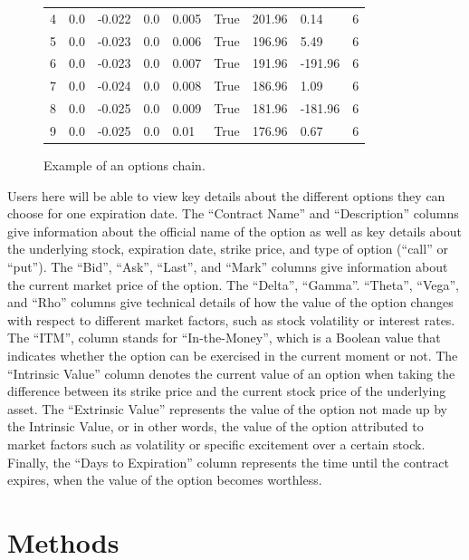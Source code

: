 \documentclass{article}
\begin{document}
\begin{figure}[h]
{\begin{tabular}{lllllllll}
    4 & 0.0   & -0.022 & 0.0  & 0.005 & True & 201.96          & 0.14            & 6                  \\
    5 & 0.0   & -0.023 & 0.0  & 0.006 & True & 196.96          & 5.49            & 6                  \\
    6 & 0.0   & -0.023 & 0.0  & 0.007 & True & 191.96          & -191.96         & 6                  \\
    7 & 0.0   & -0.024 & 0.0  & 0.008 & True & 186.96          & 1.09            & 6                  \\
    8 & 0.0   & -0.025 & 0.0  & 0.009 & True & 181.96          & -181.96         & 6                  \\
    9 & 0.0   & -0.025 & 0.0  & 0.01  & True & 176.96          & 0.67            & 6                 
    \end{tabular}%
    }
    \caption{Example of an options chain.}
    \label{fig:Figure 5}
\end{figure}

Users here will be able to view key details about the different options they can choose for one expiration date. The \enquote{Contract Name} and \enquote{Description} columns give information about the official name of the option as well as key details about the underlying stock, expiration date, strike price, and type of option (\enquote{call} or \enquote{put}). The \enquote{Bid}, \enquote{Ask}, \enquote{Last}, and \enquote{Mark} columns give information about the current market price of the option. The \enquote{Delta}, \enquote{Gamma}. \enquote{Theta}, \enquote{Vega}, and \enquote{Rho} columns give technical details of how the value of the option changes with respect to different market factors, such as stock volatility or interest rates. The \enquote{ITM}, column stands for \enquote{In-the-Money}, which is a Boolean value that indicates whether the option can be exercised in the current moment or not. The \enquote{Intrinsic Value} column denotes the current value of an option when taking the difference between its strike price and the current stock price of the underlying asset. The \enquote{Extrinsic Value} represents the value of the option not made up by the Intrinsic Value, or in other words, the value of the option attributed to market factors such as volatility or specific excitement over a certain stock. Finally, the \enquote{Days to Expiration} column represents the time until the contract expires, when the value of the option becomes worthless.  

\section{Methods}
\end{document}
